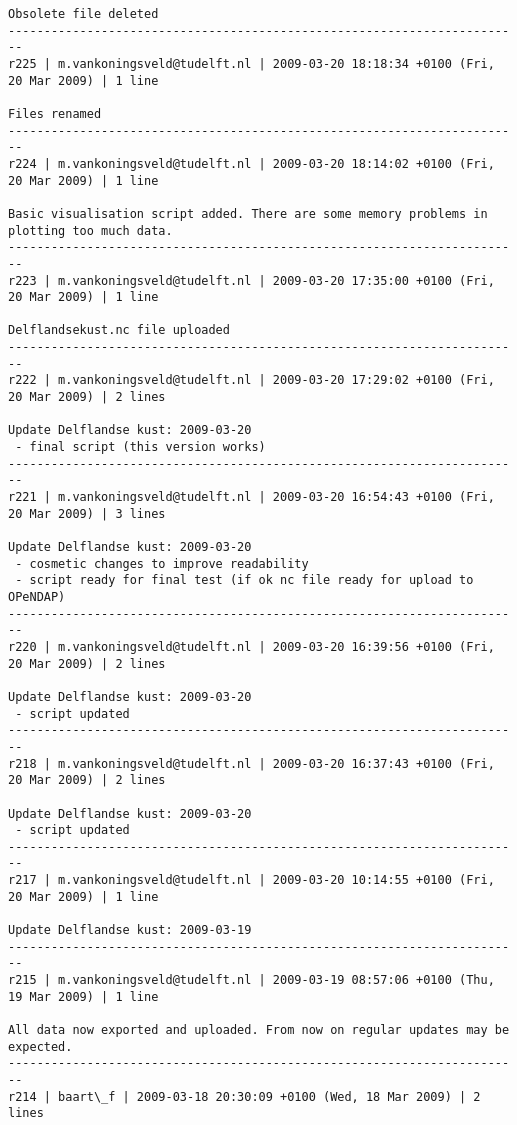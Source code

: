 \documentclass[9]{report}
\begin{document}
\begin{description}
\begin{verbatim}
Obsolete file deleted
------------------------------------------------------------------------
r225 | m.vankoningsveld@tudelft.nl | 2009-03-20 18:18:34 +0100 (Fri, 20 Mar 2009) | 1 line

Files renamed
------------------------------------------------------------------------
r224 | m.vankoningsveld@tudelft.nl | 2009-03-20 18:14:02 +0100 (Fri, 20 Mar 2009) | 1 line

Basic visualisation script added. There are some memory problems in plotting too much data.
------------------------------------------------------------------------
r223 | m.vankoningsveld@tudelft.nl | 2009-03-20 17:35:00 +0100 (Fri, 20 Mar 2009) | 1 line

Delflandsekust.nc file uploaded
------------------------------------------------------------------------
r222 | m.vankoningsveld@tudelft.nl | 2009-03-20 17:29:02 +0100 (Fri, 20 Mar 2009) | 2 lines

Update Delflandse kust: 2009-03-20
 - final script (this version works)
------------------------------------------------------------------------
r221 | m.vankoningsveld@tudelft.nl | 2009-03-20 16:54:43 +0100 (Fri, 20 Mar 2009) | 3 lines

Update Delflandse kust: 2009-03-20
 - cosmetic changes to improve readability
 - script ready for final test (if ok nc file ready for upload to OPeNDAP)
------------------------------------------------------------------------
r220 | m.vankoningsveld@tudelft.nl | 2009-03-20 16:39:56 +0100 (Fri, 20 Mar 2009) | 2 lines

Update Delflandse kust: 2009-03-20
 - script updated
------------------------------------------------------------------------
r218 | m.vankoningsveld@tudelft.nl | 2009-03-20 16:37:43 +0100 (Fri, 20 Mar 2009) | 2 lines

Update Delflandse kust: 2009-03-20
 - script updated
------------------------------------------------------------------------
r217 | m.vankoningsveld@tudelft.nl | 2009-03-20 10:14:55 +0100 (Fri, 20 Mar 2009) | 1 line

Update Delflandse kust: 2009-03-19
------------------------------------------------------------------------
r215 | m.vankoningsveld@tudelft.nl | 2009-03-19 08:57:06 +0100 (Thu, 19 Mar 2009) | 1 line

All data now exported and uploaded. From now on regular updates may be expected.
------------------------------------------------------------------------
r214 | baart\_f | 2009-03-18 20:30:09 +0100 (Wed, 18 Mar 2009) | 2 lines


\end{verbatim}
\end{description}
\end{document}
